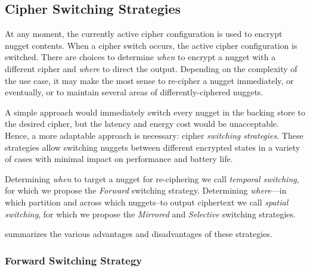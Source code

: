 \subsection{Cipher Switching Strategies} \label{subsec:strategies}


At any moment, the currently active cipher configuration is used to encrypt
nugget contents. When a cipher switch occurs, the active cipher configuration is
switched.  
There are choices to determine \emph{when} to encrypt a nugget with a
different cipher and \emph{where} to direct the output. Depending on the
complexity of the use case, it may make the most sense to re-cipher a nugget
immediately, or eventually, or to maintain several areas of differently-ciphered
nuggets.

A simple approach would immediately switch every nugget in the backing store to
the desired cipher, but the latency and energy cost would be unacceptable.
Hence, a more adaptable approach is necessary: cipher \emph{switching
strategies}. These strategies allow switching nuggets between different
encrypted states in a variety of cases with minimal impact on performance and
battery life.

Determining \emph{when} to target a nugget for re-ciphering we call
\emph{temporal switching}, for which we propose the \emph{Forward} switching
strategy. Determining \emph{where}---in which partition and across which
nuggets--to output ciphertext we call \emph{spatial switching}, for which we
propose the \emph{Mirrored} and \emph{Selective} switching strategies.

 summarizes the various advantages and
disadvantages of these strategies. 

\subsubsection{Forward Switching Strategy}

